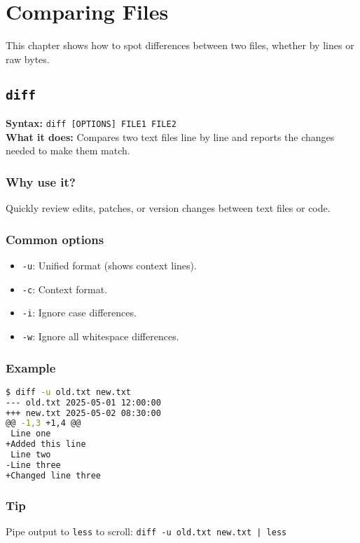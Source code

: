 \documentclass[10pt,oneside]{scrbook}
\begin{document}
\chapter{Comparing Files}

This chapter shows how to spot differences between two files, whether by lines or raw bytes.

\section{\texttt{diff}}
\begin{cmdbox}
  \textbf{Syntax:} \lstinline!diff [OPTIONS] FILE1 FILE2! \\
  \textbf{What it does:} Compares two text files line by line and reports the changes needed to make them match.
\end{cmdbox}
\begin{commanddetails}
  \subsection*{Why use it?}
    Quickly review edits, patches, or version changes between text files or code.

  \subsection*{Common options}
    \begin{itemize}
      \item \lstinline!-u!: Unified format (shows context lines).  
      \item \lstinline!-c!: Context format.  
      \item \lstinline!-i!: Ignore case differences.  
      \item \lstinline!-w!: Ignore all whitespace differences.  
    \end{itemize}

  \subsection*{Example}
  \begin{lstlisting}[language=bash]
$ diff -u old.txt new.txt
--- old.txt 2025-05-01 12:00:00
+++ new.txt 2025-05-02 08:30:00
@@ -1,3 +1,4 @@
 Line one
+Added this line
 Line two
-Line three
+Changed line three
  \end{lstlisting}

  \subsection*{Tip}
    Pipe output to \lstinline!less! to scroll:  
    \lstinline!diff -u old.txt new.txt | less!
\end{commanddetails}
\end{document}
